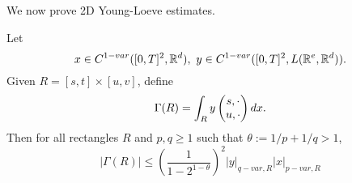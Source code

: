 We now prove 2D Young-Loeve estimates.
\begin{proposition}
    Let
    \begin{equation}
        x \in C^{1-var}([0,T]^2,\mathbb{R}^d),\ y \in C^{1-var}([0,T]^2,L(\mathbb{R}^e,\mathbb{R}^d)).
    \end{equation}
    Given \(R = [s,t] \times [u,v]\), define
    \begin{equation}
        \Gamma(R) = \int_R y \begin{pmatrix} s,\cdot \\ u,\cdot \end{pmatrix} dx.
    \end{equation}
    Then for all rectangles \(R\) and \(p,q \ge 1\) such that \(\theta:= 1/p + 1/q > 1\),
    \begin{equation}
        |\Gamma(R)| \le \left( \frac{1}{1-2^{1 - \theta}} \right)^2 |y|_{q-var,R} |x|_{p-var,R}
    \end{equation}
\end{proposition}